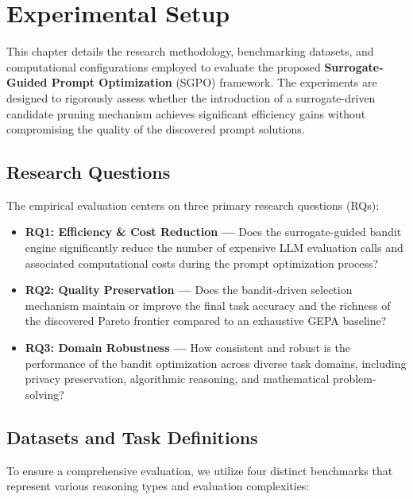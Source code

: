 \chapter{Experimental Setup}

This chapter details the research methodology, benchmarking datasets, and computational configurations employed to evaluate the proposed \textbf{Surrogate-Guided Prompt Optimization} (SGPO) framework. The experiments are designed to rigorously assess whether the introduction of a surrogate-driven candidate pruning mechanism achieves significant efficiency gains without compromising the quality of the discovered prompt solutions.

\section{Research Questions}

The empirical evaluation centers on three primary research questions (RQs):

\begin{itemize}
    \item \textbf{RQ1: Efficiency \& Cost Reduction —} Does the surrogate-guided bandit engine significantly reduce the number of expensive LLM evaluation calls and associated computational costs during the prompt optimization process?
    \item \textbf{RQ2: Quality Preservation —} Does the bandit-driven selection mechanism maintain or improve the final task accuracy and the richness of the discovered Pareto frontier compared to an exhaustive GEPA baseline?
    \item \textbf{RQ3: Domain Robustness —} How consistent and robust is the performance of the bandit optimization across diverse task domains, including privacy preservation, algorithmic reasoning, and mathematical problem-solving?
\end{itemize}

\section{Datasets and Task Definitions}

To ensure a comprehensive evaluation, we utilize four distinct benchmarks that represent various reasoning types and evaluation complexities:

